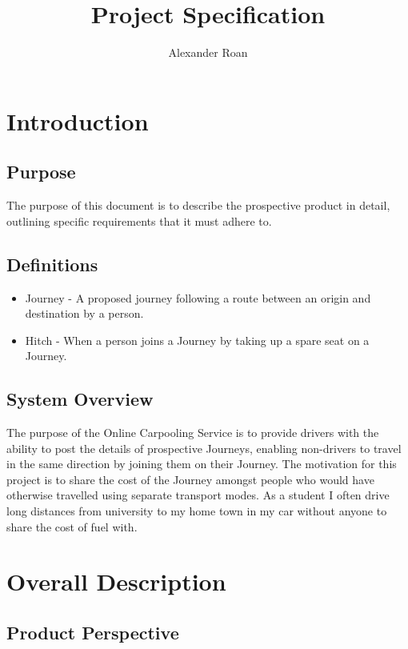 \documentclass[11pt]{article}
\begin{document}
\begin{titlepage}
\title{Project Specification}
\author{Alexander Roan}
\maketitle
\end{titlepage}

\tableofcontents
\newpage
\section{Introduction}

\subsection{Purpose}
The purpose of this document is to describe the prospective product in detail, outlining specific requirements that it must adhere to.

\subsection{Definitions}
\begin{itemize}
\item Journey - A proposed journey following a route between an origin and destination by a person.
\item Hitch - When a person joins a Journey by taking up a spare seat on a Journey.
\end{itemize}

\subsection{System Overview}
The purpose of the Online Carpooling Service is to provide drivers with the ability to post the details of prospective Journeys, enabling non-drivers to travel in the same direction by joining them on their Journey. The motivation for this project is to share the cost of the Journey amongst people who would have otherwise travelled using separate transport modes. As a student I often drive long distances from university to my home town in my car without anyone to share the cost of fuel with.


\section{Overall Description}
\subsection{Product Perspective}
\end{document}
